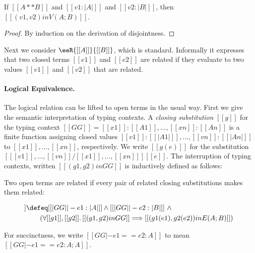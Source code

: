 \begin{lemma} \label{lemma:disjoint}
  If $[[A ** B]]$ and $[[  v1 : |A|  ]]$ and
  $[[  v2 : |B|  ]]$,
  then $[[   (v1, v2) in V ( A ; B  )    ]]$.
\end{lemma}
\begin{proof}
  By induction on the derivation of disjointness.
\end{proof}

Next we consider $\eeR{[[A]]}{[[B]]}$, which is standard. Informally it
expresses that two closed terms $[[e1]]$ and $[[e2]]$ are related if
they evaluate to two values $[[v1]]$ and $[[v2]]$ that are related.



\paragraph{Logical Equivalence.}

The logical relation can be lifted to open terms in the usual way. First we give
the semantic interpretation of typing contexts. A \textit{closing substitution}
$[[ g ]]$ for the typing context $ [[GG]] = [[x1]] : [[A1]], \dots , [[xn]] :
[[An]] $ is a finite function assigning closed values
$[[ v1 ]] : [[ |A1|]], \dots , [[vn]] : [[ |An| ]]$ to $[[ x1 ]] , \dots , [[xn]]$, respectively.
We write $[[ g(e) ]]$ for the substitution $[  [[v1]], \dots, [[vn]]  / [[x1]], \dots, [[xn]]   ] [[e]]  $.
The interruption of typing contexts, written $[[  (g1, g2) in GG ]]$ is inductively defined as follows:

\begin{definition}
\end{definition}

Two open terms are related if every pair of related closing substitutions
makes them related:
\begin{definition}
  \begin{align*}
    [[GG |- e1 == e2 : A ; B]] & \defeq [[|GG| |- e1 : |A|]] \land [[|GG| |- e2 : | B | ]] \ \land \\
                                 & \qquad (\forall [[g1]], [[g2]] .\, [[(g1, g2) in GG ]] \Longrightarrow [[(g1 (e1), g2 (e2))  in E (A ; B) ]])
  \end{align*}
\end{definition}
For succinctness, we write $[[GG |- e1 == e2 : A]]$ to mean $[[GG |- e1 == e2 : A ; A]]$.


